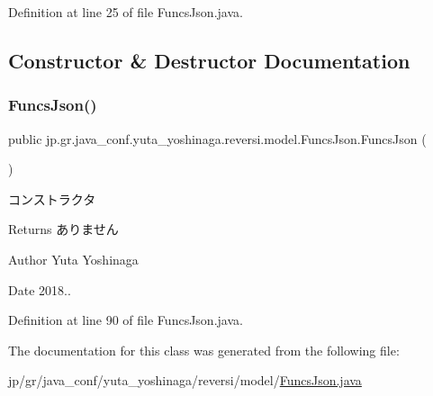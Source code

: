 Definition at line 25 of file Funcs\+Json.\+java.



\subsection{Constructor \& Destructor Documentation}
\mbox{\label{classjp_1_1gr_1_1java__conf_1_1yuta__yoshinaga_1_1reversi_1_1model_1_1_funcs_json_a20600564e1bb9ece956e36608a089536}} 
\subsubsection{\texorpdfstring{Funcs\+Json()}{FuncsJson()}}
{\footnotesize\ttfamily public jp.\+gr.\+java\+\_\+conf.\+yuta\+\_\+yoshinaga.\+reversi.\+model.\+Funcs\+Json.\+Funcs\+Json (\begin{DoxyParamCaption}{ }\end{DoxyParamCaption})}



コンストラクタ 

\begin{DoxyReturn}{Returns}
ありません 
\end{DoxyReturn}
\begin{DoxyAuthor}{Author}
Yuta Yoshinaga 
\end{DoxyAuthor}
\begin{DoxyDate}{Date}
2018.. 
\end{DoxyDate}


Definition at line 90 of file Funcs\+Json.\+java.



The documentation for this class was generated from the following file\+:\begin{DoxyCompactItemize}
\item 
jp/gr/java\+\_\+conf/yuta\+\_\+yoshinaga/reversi/model/\hyperlink{_funcs_json_8java}{Funcs\+Json.\+java}\end{DoxyCompactItemize}
